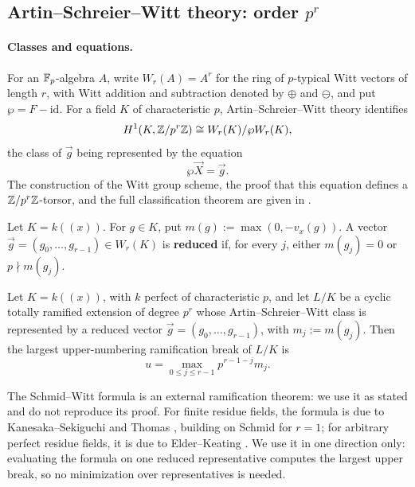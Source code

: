 \subsection{Artin--Schreier--Witt theory: order
\texorpdfstring{$p^r$}{p-power}}
\label{subsection:witt_vector_prerequisites}

\paragraph{Classes and equations.}
For an $\mathbb{F}_p$-algebra $A$, write $W_r(A)=A^r$ for the ring of $p$-typical
Witt vectors of length $r$, with Witt addition and subtraction denoted by
$\oplus$ and $\ominus$, and put $\wp=F-\mathrm{id}$. For a field $K$ of
characteristic $p$, Artin--Schreier--Witt theory identifies
\[
H^1(K,\mathbb{Z}/p^r\mathbb{Z})\cong W_r(K)/\wp W_r(K),
\]
the class of $\vec g$ being represented by the equation
\[
\wp\vec X=\vec g.
\]
The construction of the Witt group scheme, the proof that this equation
defines a $\mathbb{Z}/p^r\mathbb{Z}$-torsor, and the full classification theorem are given in
.

\begin{definition}\label{definition:reduced_witt_vector}
Let $K=k((x))$. For $g\in K$, put
$m(g):=\max(0,-v_x(g))$. A vector
$\vec g=(g_0,\dots,g_{r-1})\in W_r(K)$ is \textbf{reduced} if, for every
$j$, either $m(g_j)=0$ or $p\nmid m(g_j)$.
\end{definition}

\begin{theorem}
\label{theorem:schmid_witt_break_formula}
Let $K=k((x))$, with $k$ perfect of characteristic $p$, and let $L/K$ be a
cyclic totally ramified extension of degree $p^r$ whose
Artin--Schreier--Witt class is represented by a reduced vector
$\vec g=(g_0,\dots,g_{r-1})$, with $m_j:=m(g_j)$. Then the largest
upper-numbering ramification break of $L/K$ is
\[
u=\max_{0\leq j\leq r-1}p^{r-1-j}m_j.
\]
\end{theorem}

The Schmid--Witt formula is an external ramification theorem: we use it as
stated and do not reproduce its proof. For finite residue fields, the formula
is due to Kanesaka--Sekiguchi \cite{KanesakaSekiguchi1979} and Thomas
\cite{Thomas2005}, building on Schmid \cite{Schmid1937} for $r=1$; for
arbitrary perfect residue fields, it is due to Elder--Keating
\cite{ElderKeating2025}. We use it in one direction only: evaluating the
formula on one reduced representative computes the largest upper break, so
no minimization over representatives is needed.


